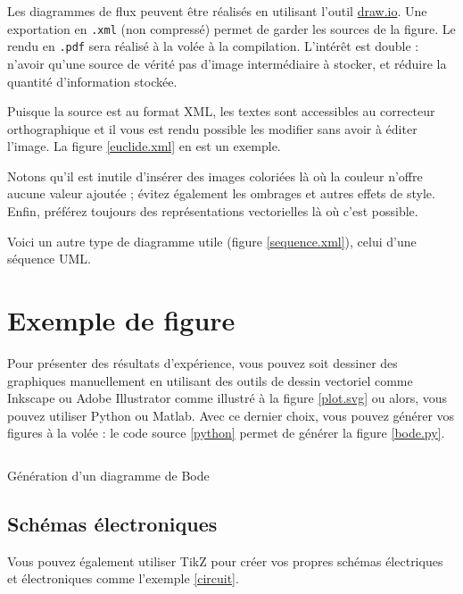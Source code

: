 \documentclass[
    iai, %
    eai, %
]{heig-tb}
\begin{document}
Les diagrammes de flux peuvent être réalisés en utilisant l'outil \href{https://app.diagrams.net/}{draw.io}. Une exportation en \texttt{.xml} (non compressé) permet de garder les sources de la figure. Le rendu en \texttt{.pdf} sera réalisé à la volée à la compilation. L'intérêt est double : n'avoir qu'une source de vérité \cad pas d'image intermédiaire à stocker, et réduire la quantité d'information stockée.

Puisque la source est au format XML, les textes sont accessibles au correcteur orthographique et il vous est rendu possible les modifier sans avoir à éditer l'image. La figure \ref{euclide.xml} en est un exemple.



Notons qu'il est inutile d'insérer des images coloriées là où la couleur n'offre aucune valeur ajoutée ; évitez également les ombrages et autres effets de style. Enfin, préférez toujours des représentations vectorielles là où c'est possible.

Voici un autre type de diagramme utile (figure \ref{sequence.xml}), celui d'une séquence UML.


\section{Exemple de figure}

Pour présenter des résultats d'expérience, vous pouvez soit dessiner des graphiques manuellement en utilisant des outils de dessin vectoriel comme Inkscape ou Adobe Illustrator comme illustré à la figure \ref{plot.svg} ou alors, vous pouvez utiliser Python ou Matlab. Avec ce dernier choix, vous pouvez générer vos figures à la volée : le code source \ref{python} permet de générer la figure \ref{bode.py}.


\begin{listing}[h]
  \inputminted[breaklines]{php}{assets/figures/php.php}
  \caption{Génération d'un diagramme de Bode \label{python}}
\end{listing}



\clearpage

\subsection{Schémas électroniques}
Vous pouvez également utiliser TikZ pour créer vos propres schémas électriques et électroniques comme l'exemple \ref{circuit}.
\end{document}
